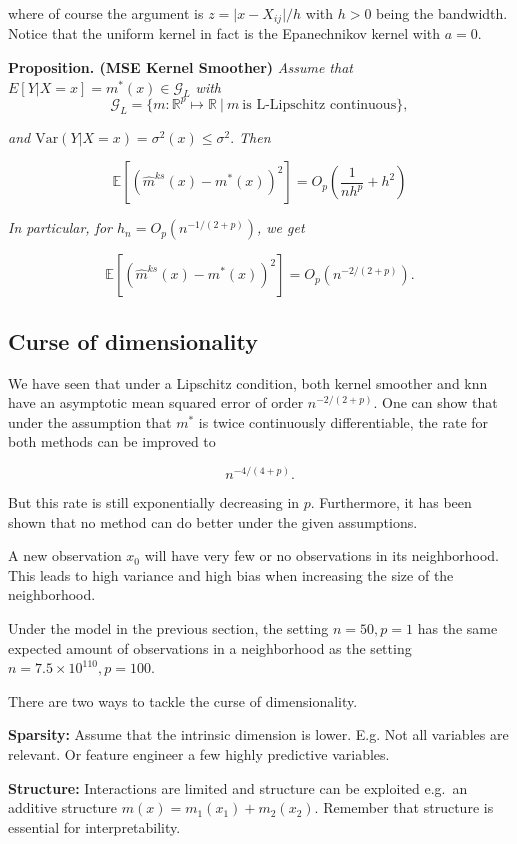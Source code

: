 \documentclass[
]{book}
\begin{document}
where of course the argument is \(z=\vert x-X_{ij}\vert/h\) with \(h>0\) being the bandwidth. Notice that the uniform kernel in fact is the Epanechnikov kernel with \(a=0\).

\textbf{Proposition. (MSE Kernel Smoother)} \emph{Assume that \(E[Y|X=x]=m^\ast(x)\in \mathcal G_L\) with}
\[
\mathcal G_L = \{m: \mathbb R^p \mapsto \mathbb R\ |\  m \ \text{is L-Lipschitz continuous}\},
\]

\emph{and \(\textrm{Var}(Y|X=x)=\sigma^2(x)\leq \sigma^2.\) Then }

\[
\mathbb E[(\hat m^{ks}(x)-m^\ast(x))^2]= O_p\left( \frac{1}{nh^p} + h^2 \right)
\]

\emph{In particular, for \(h_n=O_p(n^{-1/(2+p)})\), we get }

\[
\mathbb E[(\hat m^{ks}(x)-m^\ast(x))^2]=O_p(n^{-2/(2+p)}).
\]

\hypertarget{curse-of-dimensionality}{%
\subsection{Curse of dimensionality}\label{curse-of-dimensionality}}

We have seen that under a Lipschitz condition, both kernel smoother and knn have an asymptotic mean squared error of order \(n^{-2/(2+p)}\). One can show that under the assumption that \(m^\ast\) is twice continuously differentiable, the rate for both methods can be improved to

\[
n^{-4/(4+p)}.
\]

But this rate is still exponentially decreasing in \(p\). Furthermore, it has been shown that no method can do better under the given assumptions.

A new observation \(x_0\) will have very few or no observations in its neighborhood. This leads to high variance and high bias when increasing the size of the neighborhood.

Under the model in the previous section, the setting \(n=50,p=1\) has the same expected amount of observations in a neighborhood as the setting \(n=7.5\times10^{110}, p=100\).

There are two ways to tackle the curse of dimensionality.

\textbf{Sparsity:} Assume that the intrinsic dimension is lower. E.g. Not all variables are relevant. Or feature engineer a few highly predictive variables.

\textbf{Structure:} Interactions are limited and structure can be exploited
e.g.~an additive structure \(m(x)=m_1(x_1)+m_2(x_2)\). Remember that structure is essential for interpretability.
\end{document}
